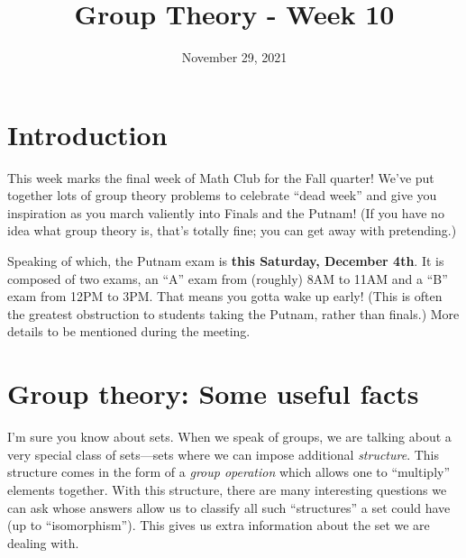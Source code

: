 \documentclass{article}
\title{Group Theory - Week 10}
\author{}
\date{November 29, 2021}
\begin{document}
\section{Introduction}
This week marks the final week of Math Club for the Fall quarter! We've put together lots of group theory problems to celebrate ``dead week'' and give you inspiration as you march valiently into Finals and the Putnam! (If you have no idea what group theory is, that's totally fine; you can get away with pretending.)

Speaking of which, the Putnam exam is \textbf{this Saturday, December 4th}. It is composed of two exams, an ``A'' exam from (roughly) 8AM to 11AM and a ``B'' exam from 12PM to 3PM. That means you gotta wake up early! (This is often the greatest obstruction to students taking the Putnam, rather than finals.) More details to be mentioned during the meeting.  

\section{Group theory: Some useful facts} 

I'm sure you know about sets. When we speak of groups, we are talking about a very special class of sets—sets where we can impose additional \emph{structure}. This structure comes in the form of a \emph{group operation} which allows one to ``multiply'' elements together. With this structure, there are many interesting questions we can ask whose answers allow us to classify all such ``structures'' a set could have (up to ``isomorphism''). This gives us extra information about the set we are dealing with. 
\end{document}

